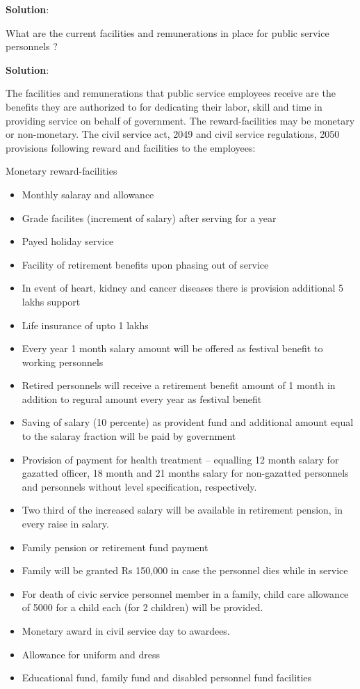 \documentclass[
  openany]{book}
\newcommand{\question}{\item}
\newenvironment{solution}{ {\bfseries Solution}:}{}
\begin{document}
\begin{questions}
\begin{solution}
\end{solution}

\question What are the current facilities and remunerations in place for public service personnels ?

\begin{solution}

The facilities and remunerations that public service employees receive are the benefits they are authorized to for dedicating their labor, skill and time in providing service on behalf of government. The reward-facilities may be monetary or non-monetary. The civil service act, 2049 and civil service regulations, 2050 provisions following reward and facilities to the employees:

Monetary reward-facilities

\begin{itemize}
\item Monthly salaray and allowance
\item Grade facilites (increment of salary) after serving for a year
\item Payed holiday service
\item Facility of retirement benefits upon phasing out of service
\item In event of heart, kidney and cancer diseases there is provision additional 5 lakhs support
\item Life insurance of upto 1 lakhs
\item Every year 1 month salary amount will be offered as festival benefit to working personnels
\item Retired personnels will receive a retirement benefit amount of 1 month in addition to regural amount every year as festival benefit
\item Saving of salary (10 percente) as provident fund and additional amount equal to the salaray fraction will be paid by government
\item Provision of payment for health treatment -- equalling 12 month salary for gazatted officer, 18 month and 21 months salary for non-gazatted personnels and personnels without level specification, respectively.
\item Two third of the increased salary will be available in retirement pension, in every raise in salary.
\item Family pension or retirement fund payment
\item Family will be granted Rs 150,000 in case the personnel dies while in service
\item For death of civic service personnel member in a family, child care allowance of 5000 for a child each (for 2 children) will be provided.
\item Monetary award in civil service day to awardees.
\item Allowance for uniform and dress
\item Educational fund, family fund and disabled personnel fund facilities
\end{itemize}


\end{solution}
\end{questions}
\end{document}

